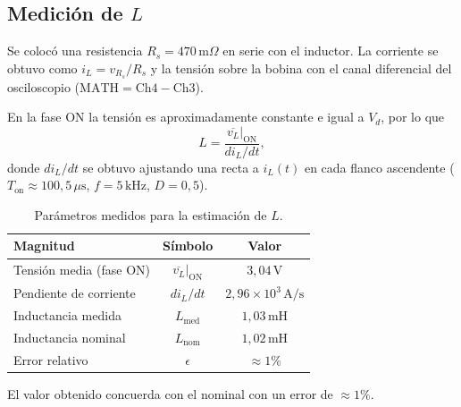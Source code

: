 \subsection{Medición de $L$}

Se colocó una resistencia $R_s = 470\,\text{m}\Omega$ en serie con el inductor. La corriente
se obtuvo como $i_L = v_{R_s}/R_s$ y la tensión sobre la bobina con el canal diferencial
del osciloscopio ($\text{MATH} = \text{Ch4} - \text{Ch3}$).

En la fase ON la tensión es aproximadamente constante e igual a $V_d$, por lo que
\begin{equation}
    L = \frac{\overline{v_L}|_{\text{ON}}}{di_L/dt},
\end{equation}
donde $di_L/dt$ se obtuvo ajustando una recta a $i_L(t)$ en cada flanco ascendente
($T_{\text{on}} \approx 100{,}5\,\mu\text{s}$, $f = 5\,\text{kHz}$, $D = 0{,}5$).

\begin{table}[h!]
\centering
\caption{Parámetros medidos para la estimación de $L$.}
\label{tab:inductor_medicion}
\begin{tabular}{lcc}
\hline
\textbf{Magnitud} & \textbf{Símbolo} & \textbf{Valor} \\
\hline
Tensión media (fase ON)            & $\overline{v_L}|_{\text{ON}}$ & $3{,}04\,\text{V}$                  \\
Pendiente de corriente             & $di_L/dt$                     & $2{,}96 \times 10^3\,\text{A/s}$   \\
Inductancia medida                 & $L_{\text{med}}$              & $1{,}03\,\text{mH}$                 \\
Inductancia nominal                & $L_{\text{nom}}$              & $1{,}02\,\text{mH}$                 \\
Error relativo                     & $\epsilon$                    & $\approx 1\%$                       \\
\hline
\end{tabular}
\end{table}

El valor obtenido concuerda con el nominal con un error de $\approx 1\%$.